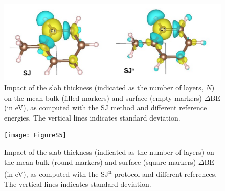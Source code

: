 \documentclass[%
aip,
amsmath,amssymb,
preprint,%
]{revtex4-2}
\def\dbe{\ensuremath{\Delta\text{BE}}}
\begin{document}
\begin{figure}[!h]
\centering
\includegraphics[width=\linewidth]{FigureS4}
\caption{Impact of the slab thickness (indicated as the number of layers, $N$) on the mean bulk (filled markers)  and surface (empty markers) \dbe{} (in \si{\electronvolt}), as computed with the SJ method and different reference energies. The vertical lines indicates standard deviation.}
\label{fig:slabsthicknessSJ}
\end{figure}

\begin{figure}[!h]
\centering
\texttt{[image: FigureS5]}
\caption{Impact of the slab thickness (indicated as the number of layers) on the mean bulk (round markers)  and surface (square markers) \dbe{} (in \si{\electronvolt}), as computed with the SJ\textsuperscript{n} protocol and different references. The vertical lines indicates standard deviation.}
\label{fig:slabsthicknessSJn}
\end{figure}
\end{document}
